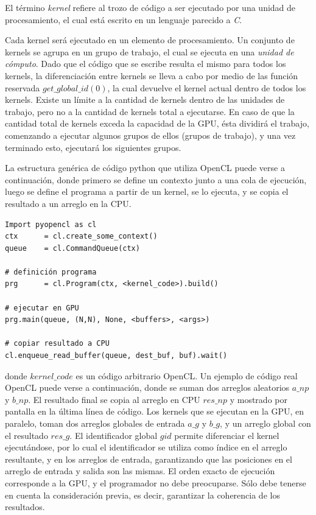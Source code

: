 El término {\em kernel} refiere al trozo de código a ser ejecutado por una unidad de procesamiento, el cual está escrito en un lenguaje parecido a {\em C}.

Cada kernel será ejecutado en un elemento de procesamiento.
Un conjunto de kernels se agrupa en un grupo de trabajo, el cual se ejecuta en una {\em unidad de cómputo}.
Dado que el código que se escribe resulta el mismo para todos los kernels, la diferenciación entre kernels se lleva a cabo por medio de las función reservada $get\_global\_id(0)$, la cual devuelve el kernel actual dentro de todos los kernels.
Existe un límite a la cantidad de kernels dentro de las unidades de trabajo, pero no a la cantidad de kernels total a ejecutarse.
En caso de que la cantidad total de kernels exceda la capacidad de la GPU, ésta dividirá el trabajo, comenzando a ejecutar algunos grupos de ellos (grupos de trabajo), y una vez terminado esto, ejecutará los siguientes grupos.


La estructura genérica de código python que utiliza OpenCL puede verse a continuación,
donde primero se define un contexto junto a una cola de ejecución, luego se define el programa a partir de un kernel, se lo ejecuta, y se copia el resultado a un arreglo en la CPU.

\begin{verbatim}
Import pyopencl as cl
ctx      = cl.create_some_context()
queue    = cl.CommandQueue(ctx)

# definición programa
prg      = cl.Program(ctx, <kernel_code>).build()

# ejecutar en GPU
prg.main(queue, (N,N), None, <buffers>, <args>) 

# copiar resultado a CPU
cl.enqueue_read_buffer(queue, dest_buf, buf).wait()
\end{verbatim}

donde $kernel\_code$ es un código arbitrario OpenCL.
Un ejemplo de código real OpenCL puede verse a continuación, donde se suman dos arreglos aleatorios $a\_{np}$ y $b\_{np}$. El resultado final se copia al arreglo en CPU $res\_np$ y mostrado por pantalla en la última línea de código.
Los kernels que se ejecutan en la GPU, en paralelo, toman dos arreglos globales de entrada $a\_g$ y $b\_g$, y un arreglo global con el resultado $res\_g$.
El identificador global $gid$ permite diferenciar el kernel ejecutándose, por lo cual el identificador se utiliza como índice en el arreglo resultante, y en los arreglos de entrada, garantizando que las posiciones en el arreglo de entrada y salida son las mismas.
El orden exacto de ejecución corresponde a la GPU, y el programador no debe preocuparse.
Sólo debe tenerse en cuenta la consideración previa, es decir, garantizar la coherencia de los resultados.


